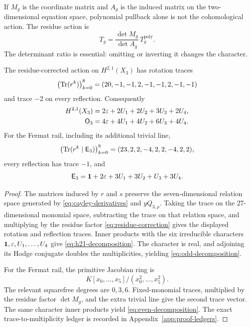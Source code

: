 If \(M_g\) is the coordinate matrix and \(A_g\) is the induced matrix on
the two-dimensional equation space, polynomial pullback alone is not the
cohomological action.  The residue action is
\begin{equation}
T_g=\frac{\det M_g}{\det A_g}\,T_g^{\mathrm{poly}}.
\label{eq:residue-correction}
\end{equation}
The determinant ratio is essential: omitting or inverting it changes the
character.

\begin{theorem}
\label{thm:n3-character}
The residue-corrected action on \(H^{2,1}(X_3)\) has rotation traces
\[
\bigl(\operatorname{Tr}(r^k)\bigr)_{k=0}^{8}
=(20,-1,-1,2,-1,-1,2,-1,-1)
\]
and trace \(-2\) on every reflection.  Consequently
\begin{align}
H^{2,1}(X_3)
&=2\varepsilon+2U_1+2U_2+3U_3+2U_4,
\label{eq:h21-decomposition}\\
\mathsf O_3
&=4\varepsilon+4U_1+4U_2+6U_3+4U_4.
\label{eq:odd-decomposition}
\end{align}
For the Fermat rail, including its additional trivial line,
\[
\bigl(\operatorname{Tr}(r^k\mid\mathsf E_3)\bigr)_{k=0}^{8}
=(23,2,2,-4,2,2,-4,2,2),
\]
every reflection has trace \(-1\), and
\begin{equation}
\mathsf E_3
=\mathbf 1+2\varepsilon+3U_1+3U_2+U_3+3U_4.
\label{eq:even-decomposition}
\end{equation}
\end{theorem}

\begin{proof}
The matrices induced by \(r\) and \(s\) preserve the seven-dimensional
relation space generated by \eqref{eq:cayley-derivatives} and
\(yQ_{3,\rho}\).  Taking the trace on the 27-dimensional monomial space,
subtracting the trace on that relation space, and multiplying by the residue
factor \eqref{eq:residue-correction} gives the displayed rotation and
reflection traces.  Inner products with the six irreducible characters
\(\mathbf 1,\varepsilon,U_1,\ldots,U_4\) give
\eqref{eq:h21-decomposition}.  The character is real, and adjoining its
Hodge conjugate doubles the multiplicities, yielding
\eqref{eq:odd-decomposition}.

For the Fermat rail, the primitive Jacobian ring is
\[
K[x_0,\ldots,x_5]/(x_0^2,\ldots,x_5^2).
\]
The relevant squarefree degrees are \(0,3,6\).  Fixed-monomial traces,
multiplied by the residue factor \(\det M_g\), and the extra trivial line
give the second trace vector.  The same character inner products yield
\eqref{eq:even-decomposition}.  The exact trace-to-multiplicity ledger is
recorded in Appendix~\ref{app:proof-ledgers}.
\end{proof}

